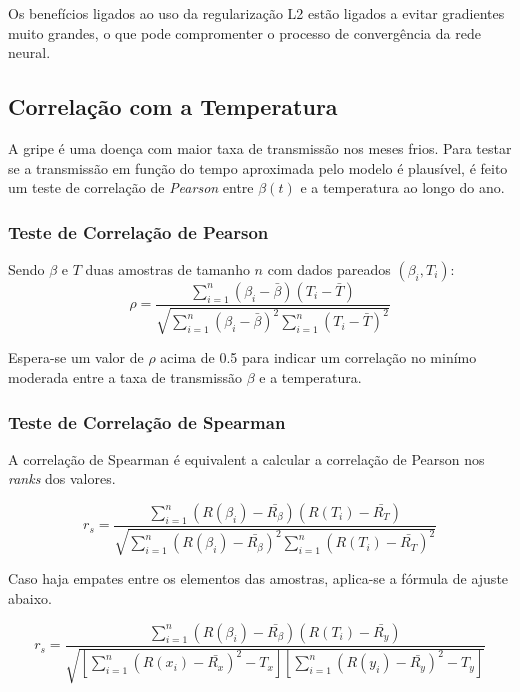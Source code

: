 Os benefícios ligados ao uso da regularização L2 estão ligados a evitar gradientes
muito grandes, o que pode compromenter o processo de convergência da rede neural.

\subsection{Correlação com a Temperatura}

A gripe é uma doença com maior taxa de transmissão nos meses frios. 
Para testar se a transmissão em função do tempo aproximada pelo modelo é plausível,
é feito um teste de correlação de \textit{Pearson} entre $\beta(t)$ e a temperatura
ao longo do ano.

\subsubsection{Teste de Correlação de Pearson}

Sendo $\beta$ e $T$ duas amostras de tamanho $n$ com dados pareados $(\beta_i, T_i)$:
\begin{equation}\label{correlacao-de-pearson}
\rho = \frac{\sum_{i=1}^{n} (\beta_i - \bar{\beta})(T_i - \bar{T})}{\sqrt{\sum_{i=1}^{n} (\beta_i - \bar{\beta})^2 \sum_{i=1}^{n} (T_i - \bar{T})^2}}
\end{equation}

Espera-se um valor de $\rho$ acima de 0.5 para indicar um correlação no minímo moderada
entre a taxa de transmissão $\beta$ e a temperatura.

\subsubsection{Teste de Correlação de Spearman}

A correlação de Spearman é equivalent a calcular a correlação de Pearson nos 
\textit{ranks} dos valores.

\begin{equation}
r_s = \frac{\sum_{i=1}^{n} (R(\beta_i) - \bar{R_{\beta}})(R(T_i) - \bar{R_{T}})}{\sqrt{\sum_{i=1}^{n} (R(\beta_i) - \bar{R_{\beta}})^2 \sum_{i=1}^{n} (R(T_i) - \bar{R_T})^2}}
\end{equation}

Caso haja empates entre os elementos das amostras, aplica-se a fórmula de ajuste
abaixo.

\begin{equation}
r_s = \frac{\sum_{i=1}^{n} (R(\beta_i) - \bar{R_{\beta}})(R(T_i) - \bar{R_y})}{\sqrt{\left[\sum_{i=1}^{n} (R(x_i) - \bar{R_x})^2 - T_x\right]\left[\sum_{i=1}^{n} (R(y_i) - \bar{R_y})^2 - T_y\right]}}
\end{equation}

